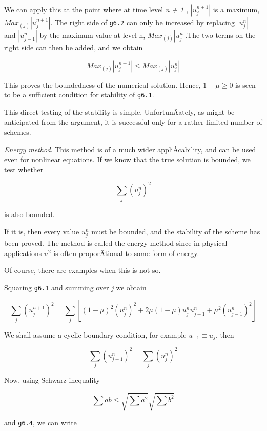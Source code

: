 We can apply this at the point where at time level \emph{n + 1} ,
\(\left| u_{j}^{n + 1} \right|\) is a maximum,
\({Max}_{(j)} \left | u_{j}^{n + 1} \right|\). The right side of
\texttt{g6.2} can only be increased by replacing
\(\left| u_{j}^{n} \right|\) and \(\left| u_{j-1}^{n} \right|\) by the
maximum value at level n, \({Max}_{(j)} \left| u_{j}^{n} \right|\).The
two terms on the right side can then be added, and we obtain

\[{Max}_{(j)} \left| u_{j}^{n + 1} \right| \leq {Max}_{(j)}\left| u_{j}^{n} \right|\]

This proves the boundedness of the numerical solution. Hence,
\(1 - \mu \geq 0\) is seen to be a sufficient condition for stability of
\texttt{g6.1}.

This direct testing of the stability is simple. UnfortunÂ­ately, as might
be anticipated from the argument, it is successful only for a rather
limited number of schemes.

\emph{Energy method}. This method is of a much wider appliÂ­cability, and
can be used even for nonlinear equations. If we know that the true
solution is bounded, we test whether

\[{\sum_{j}^{}\left( u_{j}^{n} \right)}^{2}\]

is also bounded.

If it is, then every value \(u_{j}^{n}\) must be bounded, and the
stability of the scheme has been proved. The method is called the energy
method since in physical applications \(u^{2}\) is often proporÂ­tional
to some form of energy.

Of course, there are examples when this is not so.

Squaring \texttt{g6.1} and summing over \emph{j} we obtain

    {\[{\sum_{j}^{}\left( u_{j}^{n + 1} \right)}^{2} =
\sum_{j}^{}\left\lbrack \left( 1 - \mu \right)^{2}\left( u_{j}^{n} \right)^{2} +
2\mu\left( 1 - \mu \right)u_{j}^{n}u_{j - 1}^{n} + \mu^{2}\left( u_{j - 1}^{n} \right)^{2} \right\rbrack\]}

We shall assume a cyclic boundary condition, for example
\(u_{- 1} \equiv u_{j}\), then

    {\[{\sum_{j}^{}\left( u_{j - 1}^{n} \right)}^{2} =  {\sum_{j}^{}\left( u_{j}^{n} \right)}^{2}\]}

Now, using Schwarz inequality

\[\sum_{}^{}{ab \leq \sqrt{\sum_{}^{}a^{2}}}\sqrt{\sum_{}^{}b^{2}}\]

and \texttt{g6.4}, we can write

